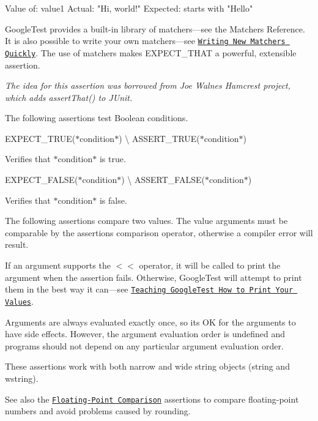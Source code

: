 \begin{DoxyCode}
Value of: value1
  Actual: "Hi, world!"
Expected: starts with "Hello"
\end{DoxyCode}


Google\+Test provides a built-\/in library of matchers—see the Matchers Reference. It is also possible to write your own matchers—see \href{../gmock_cook_book.md#NewMatchers}{\tt Writing New Matchers Quickly}. The use of matchers makes {\ttfamily E\+X\+P\+E\+C\+T\+\_\+\+T\+H\+AT} a powerful, extensible assertion.

{\itshape The idea for this assertion was borrowed from Joe Walnes\textquotesingle{} Hamcrest project, which adds {\ttfamily assert\+That()} to J\+Unit.}

The following assertions test Boolean conditions.

{\ttfamily E\+X\+P\+E\+C\+T\+\_\+\+T\+R\+UE(}$\ast${\ttfamily condition}$\ast${\ttfamily )} \textbackslash{} {\ttfamily A\+S\+S\+E\+R\+T\+\_\+\+T\+R\+UE(}$\ast${\ttfamily condition}$\ast${\ttfamily )}

Verifies that $\ast${\ttfamily condition}$\ast$ is true.

{\ttfamily E\+X\+P\+E\+C\+T\+\_\+\+F\+A\+L\+SE(}$\ast${\ttfamily condition}$\ast${\ttfamily )} \textbackslash{} {\ttfamily A\+S\+S\+E\+R\+T\+\_\+\+F\+A\+L\+SE(}$\ast${\ttfamily condition}$\ast${\ttfamily )}

Verifies that $\ast${\ttfamily condition}$\ast$ is false.

The following assertions compare two values. The value arguments must be comparable by the assertion\textquotesingle{}s comparison operator, otherwise a compiler error will result.

If an argument supports the {\ttfamily $<$$<$} operator, it will be called to print the argument when the assertion fails. Otherwise, Google\+Test will attempt to print them in the best way it can—see \href{../advanced.md#teaching-googletest-how-to-print-your-values}{\tt Teaching Google\+Test How to Print Your Values}.

Arguments are always evaluated exactly once, so it\textquotesingle{}s OK for the arguments to have side effects. However, the argument evaluation order is undefined and programs should not depend on any particular argument evaluation order.

These assertions work with both narrow and wide string objects ({\ttfamily string} and {\ttfamily wstring}).

See also the \href{#floating-point}{\tt Floating-\/\+Point Comparison} assertions to compare floating-\/point numbers and avoid problems caused by rounding.

